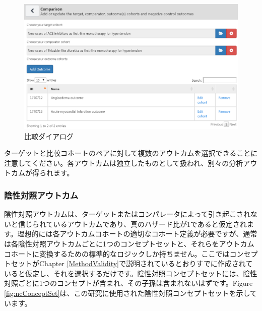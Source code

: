 \documentclass[
  11pt]{book}
\theoremstyle{definition}
\theoremstyle{definition}
\theoremstyle{definition}
\theoremstyle{definition}
\theoremstyle{remark}
\begin{document}
\begin{figure}

{\centering \includegraphics[width=1\linewidth]{images/PopulationLevelEstimation/comparisons} 

}

\caption{比較ダイアログ}\label{fig:comparisons}
\end{figure}

ターゲットと比較コホートのペアに対して複数のアウトカムを選択できることに注意してください。各アウトカムは独立したものとして扱われ、別々の分析アウトカムが得られます。

\subsubsection*{陰性対照アウトカム}\label{ux9670ux6027ux5bfeux7167ux30a2ux30a6ux30c8ux30abux30e0}

陰性対照アウトカムは、ターゲットまたはコンパレータによって引き起こされないと信じられているアウトカムであり、真のハザード比が1であると仮定されます。理想的には各アウトカムコホートの適切なコホート定義が必要ですが、通常は各陰性対照アウトカムごとに1つのコンセプトセットと、それらをアウトカムコホートに変換するための標準的なロジックしか持ちません。ここではコンセプトセットがChapter \ref{MethodValidity}で説明されているとおりすでに作成されていると仮定し、それを選択するだけです。陰性対照コンセプトセットには、陰性対照ごとに1つのコンセプトが含まれ、その子孫は含まれないはずです。Figure \ref{fig:ncConceptSet}は、この研究に使用された陰性対照コンセプトセットを示しています。
\end{document}

